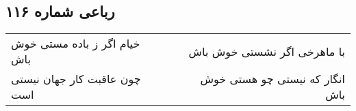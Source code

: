 \begin{center}
\section*{رباعی شماره ۱۱۶}
\label{sec:sh116}
\begin{longtable}{l p{0.5cm} r}
خیام اگر ز باده مستی خوش باش
&&
با ماهرخی اگر نشستی خوش باش
\\
چون عاقبت کار جهان نیستی است
&&
انگار که نیستی چو هستی خوش باش
\\
\end{longtable}
\end{center}
